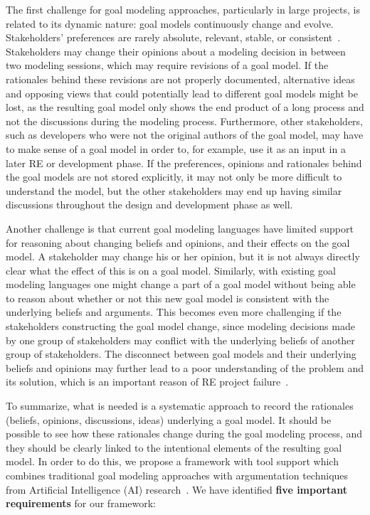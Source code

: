 The first challenge for goal modeling approaches, particularly in large projects, is related to its dynamic nature: goal models continuously change and evolve. Stakeholders' preferences are rarely absolute, relevant, stable, or consistent~\cite{march1978bounded}. Stakeholders may change their opinions about a modeling decision in between two modeling sessions, which may require revisions of a goal model. If the rationales behind these revisions are not properly documented, alternative ideas and opposing views that could potentially lead to different goal models might be lost, as the resulting goal model only shows the end product of a long process and not the discussions during the modeling process. Furthermore, other stakeholders, such as developers who were not the original authors of the goal model, may have to make sense of a goal model in order to, for example, use it as an input in a later RE or development phase. If the preferences, opinions and rationales behind the goal models are not stored explicitly, it may not only be more difficult to understand the model, but the other stakeholders may end up having similar discussions throughout the design and development phase as well.

Another challenge is that current goal modeling languages have limited support for reasoning about changing beliefs and opinions, and their effects on the goal model. A stakeholder may change his or her opinion, but it is not always directly clear what the effect of this is on a goal model. Similarly, with existing goal modeling languages one might change a part of a goal model without being able to reason about whether or not this new goal model is consistent with the underlying beliefs and arguments. This becomes even more challenging if the stakeholders constructing the goal model change, since modeling decisions made by one group of stakeholders may conflict with the underlying beliefs of another group of stakeholders. The disconnect between goal models and their underlying beliefs and opinions may further lead to a poor understanding of the problem and its solution, which is an important reason of RE project failure~\cite{curtis1988field}. 

To summarize, what is needed is a systematic approach to record the rationales (beliefs, opinions, discussions, ideas) underlying a goal model. It should be possible to see how these rationales change during the goal modeling process, and they should be clearly linked to the intentional elements of the resulting goal model. In order to do this, we propose a framework with tool support which combines traditional goal modeling approaches with argumentation techniques from Artificial Intelligence (AI) research~\cite{BenchCaponDunne2007}. We have identified \textbf{five important requirements} for our framework: 


